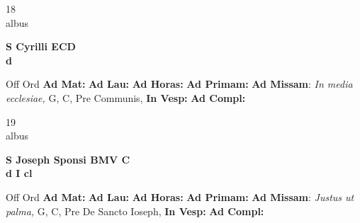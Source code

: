 \documentclass[10pt, openany]{book}
\begin{document}
    \begin{center}
        \begin{minipage}{3.5in}
            \vspace{2em}
            \begin{minipage}{0.5in}
                {\Huge 18} \\
                {\normalsize albus}
            \end{minipage}
            \begin{minipage}{3.0in}
                \textbf{ \large S Cyrilli ECD \\
                \textnormal{\normalsize d}}

            \end{minipage}
            \begin{justify}Off Ord
                \textbf{Ad Mat: }
                \textbf{Ad Lau: }
                \textbf{Ad Horas: }
                \textbf{Ad Primam: }\textbf{Ad Missam}: \textit{In media ecclesiae,} G, C, Pre Communis, 
                \textbf{In Vesp: }
                \textbf{Ad Compl: }
            \end{justify}
        \end{minipage}
    \end{center}

    \begin{center}
        \begin{minipage}{3.5in}
            \vspace{2em}
            \begin{minipage}{0.5in}
                {\Huge 19} \\
                {\normalsize albus}
            \end{minipage}
            \begin{minipage}{3.0in}
                \textbf{ \large S Joseph Sponsi BMV C \\
                \textnormal{\normalsize d I cl}}

            \end{minipage}
            \begin{justify}Off Ord
                \textbf{Ad Mat: }
                \textbf{Ad Lau: }
                \textbf{Ad Horas: }
                \textbf{Ad Primam: }\textbf{Ad Missam}: \textit{Justus ut palma,} G, C, Pre De Sancto Ioseph, 
                \textbf{In Vesp: }
                \textbf{Ad Compl: }
            \end{justify}
        \end{minipage}
    \end{center}
\end{document}
